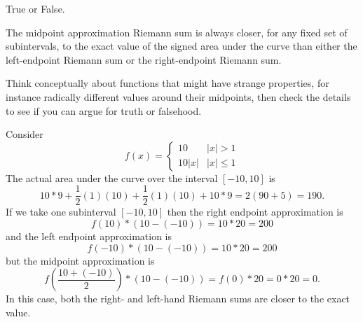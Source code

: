 \documentclass{ximera}
\author{Emma Smith Zbarsky}
\begin{document}
\begin{exercise}

True or False.

The midpoint approximation Riemann sum is always closer, for any fixed
set of subintervals, to the exact value of the signed area under the
curve than either the left-endpoint Riemann sum or the right-endpoint
Riemann sum.


\begin{hint}
Think conceptually about functions that might have strange properties,
for instance radically different values around their midpoints, then
check the details to see if you can argue for truth or falsehood.
\end{hint}


\begin{hint}
Consider \[f(x) = \begin{cases} 10 & |x|>1 \\
10|x| & |x|\leq 1 \end{cases}\] The actual area under the curve over the
interval $[-10,10]$ is
\[10*9+\frac{1}{2}(1)(10)+\frac{1}{2}(1)(10)+10*9 = 2(90+5) = 190.\] If
we take one subinterval $[-10,10]$ then the right endpoint approximation
is \[f(10)*\left(10-(-10)\right) = 10*20 = 200\] and the left endpoint
approximation is \[f(-10)*\left(10-(-10)\right) = 10*20 = 200\] but the
midpoint approximation is
\[f\left(\frac{10+(-10)}{2}\right)*\left(10-(-10)\right) = f(0)*20 = 0*20 = 0.\]
In this case, both the right- and left-hand Riemann sums are closer to
the exact value.
\end{hint}


\begin{multipleChoice}
\end{multipleChoice}

\end{exercise}
\end{document}
